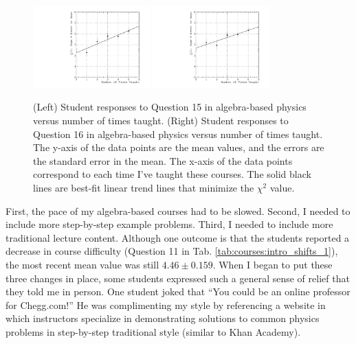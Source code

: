 \documentclass[../../main.tex]{subfiles}
\begin{document}
\begin{figure}[hb]
\centering
\includegraphics[width=0.4\textwidth]{Q15_algebra_based.pdf}
\includegraphics[width=0.4\textwidth]{Q16_algebra_based.pdf}
\caption{\label{fig:courses:intro_q15}  (Left) Student responses to Question 15 in algebra-based physics versus number of times taught. (Right) Student responses to Question 16 in algebra-based physics versus number of times taught.  The y-axis of the data points are the mean values, and the errors are the standard error in the mean.  The x-axis of the data points correspond to each time I've taught these courses.  The solid black lines are best-fit linear trend lines that minimize the $\chi^2$ value.}
\end{figure}

First, the pace of my algebra-based courses had to be slowed.  Second, I needed to include more step-by-step example problems.  Third, I needed to include more traditional lecture content.  Although one outcome is that the students reported a decrease in course difficulty (Question 11 in Tab. \ref{tab:courses:intro_shifts_1}), the most recent mean value was still $4.46 \pm 0.159$.  When I began to put these three changes in place, some students expressed such a general sense of relief that they told me in person.  One student joked that ``You could be an online professor for Chegg.com!'' He was complimenting my style by referencing a website in which instructors specialize in demonstrating solutions to common physics problems in step-by-step traditional style (similar to Khan Academy).  \\ \hspace{0.1cm}
\end{document}
